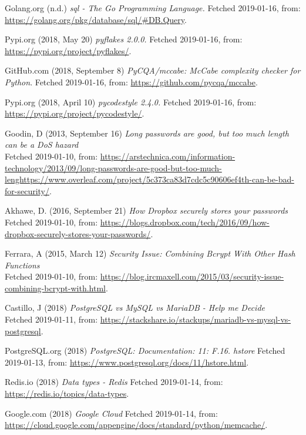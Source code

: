\documentclass[12pt,a4paper]{report}
\begin{document}
{\begin{thebibliography}{1}
 Golang.org (n.d.) {\em sql - The Go Programming Language.} Fetched 2019-01-16, from: \url{https://golang.org/pkg/database/sql/#DB.Query}.

 Pypi.org (2018, May 20) {\em pyflakes 2.0.0.} Fetched 2019-01-16, from: \url{https://pypi.org/project/pyflakes/}.

 GitHub.com (2018, September 8) {\em PyCQA/mccabe: McCabe complexity checker for Python}. Fetched 2019-01-16, from: \url{https://github.com/pycqa/mccabe}.

 Pypi.org (2018, April 10) {\em pycodestyle 2.4.0.} Fetched 2019-01-16, from: \url{https://pypi.org/project/pycodestyle/}.

Goodin, D (2013, September 16) {\em Long passwords are good, but too much length can be a DoS hazard} \\
Fetched 2019-01-10, from:
\url{https://arstechnica.com/information-technology/2013/09/long-passwords-are-good-but-too-much-lenghttps://www.overleaf.com/project/5c373ca83d7cdc5c90606ef4th-can-be-bad-for-security/}.

Akhawe, D. (2016, September 21) {\em How Dropbox securely stores your passwords} \\
Fetched 2019-01-10, from:
\url{https://blogs.dropbox.com/tech/2016/09/how-dropbox-securely-stores-your-passwords/}.

Ferrara, A (2015, March 12) {\em Security Issue: Combining Bcrypt With Other Hash Functions} \\
Fetched 2019-01-10, from:
\url{https://blog.ircmaxell.com/2015/03/security-issue-combining-bcrypt-with.html}.

Castillo, J (2018) {\em PostgreSQL vs MySQL vs MariaDB - Help me Decide} \\
Fetched 2019-01-11, from:
\url{https://stackshare.io/stackups/mariadb-vs-mysql-vs-postgresql}.

PostgreSQL.org (2018) {\em PostgreSQL: Documentation: 11: F.16. hstore} Fetched 2019-01-13, from: \url{https://www.postgresql.org/docs/11/hstore.html}.

Redis.io (2018) {\em Data types - Redis} Fetched 2019-01-14, from: \url{https://redis.io/topics/data-types}.

Google.com (2018) {\em Google Cloud} Fetched 2019-01-14, from: \url{https://cloud.google.com/appengine/docs/standard/python/memcache/}.


\end{thebibliography}}
\end{document}
